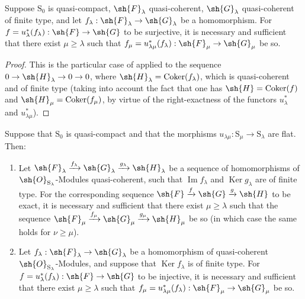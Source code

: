 \begin{corollary}[8.5.7]
\label{IV.8.5.7}
Suppose $\mathrm{S}_0$ is quasi-compact, $\sh{F}_\lambda$ quasi-coherent, $\sh{G}_\lambda$ quasi-coherent of finite type, and let $f_\lambda:\sh{F}_\lambda\to\sh{G}_\lambda$ be a homomorphism.
For $f=u_\lambda^*(f_\lambda):\sh{F}\to\sh{G}$ to be surjective, it is necessary and sufficient that there exist $\mu\geqslant\lambda$ such that $f_\mu=u_{\lambda\mu}^*(f_\lambda):\sh{F}_\mu\to\sh{G}_\mu$ be so.
\end{corollary}

\begin{proof}
This is the particular case of  applied to the sequence $0\to\sh{H}_\lambda\to 0\to 0$, where $\sh{H}_\lambda=\operatorname{Coker}(f_\lambda)$, which is quasi-coherent and of finite type (taking into account the fact that one has $\sh{H}=\operatorname{Coker}(f)$ and $\sh{H}_\mu=\operatorname{Coker}(f_\mu)$, by virtue of the right-exactness of the functors $u_\lambda^*$ and $u_{\lambda\mu}^*$).
\end{proof}

\begin{corollary}[8.5.8]
\label{IV.8.5.8}
Suppose that $\mathrm{S}_0$ is quasi-compact and that the morphisms $u_{\lambda\mu}:\mathrm{S}_\mu\to\mathrm{S}_\lambda$ are flat.
Then:
\begin{enumerate}[label=(\roman*)]
  \item Let $\sh{F}_\lambda\xrightarrow{f_\lambda}\sh{G}_\lambda\xrightarrow{g_\lambda}\sh{H}_\lambda$ be a sequence of homomorphisms of $\sh{O}_{\mathrm{S}_\lambda}$-Modules quasi-coherent, such that $\operatorname{Im} f_\lambda$ and $\operatorname{Ker} g_\lambda$ are of finite type.
For the corresponding sequence $\sh{F}\xrightarrow{f}\sh{G}\xrightarrow{g}\sh{H}$ to be
exact, it is necessary and sufficient that there exist $\mu\geqslant\lambda$ such that the sequence $\sh{F}_\mu\xrightarrow{f_\mu}\sh{G}_\mu\xrightarrow{g_\mu}\sh{H}_\mu$ be so (in which case the same holds for $\nu\geqslant\mu$).
  \item Let $f_\lambda:\sh{F}_\lambda\to\sh{G}_\lambda$ be a homomorphism of quasi-coherent $\sh{O}_{\mathrm{S}_\lambda}$-Modules, and suppose that $\operatorname{Ker} f_\lambda$ is of finite type.
For $f=u_\lambda^*(f_\lambda):\sh{F}\to\sh{G}$ to be injective, it is necessary and sufficient that there exist $\mu\geqslant\lambda$ such that $f_\mu=u_{\lambda\mu}^*(f_\lambda):\sh{F}_\mu\to\sh{G}_\mu$ be so.
\end{enumerate}
\end{corollary}

